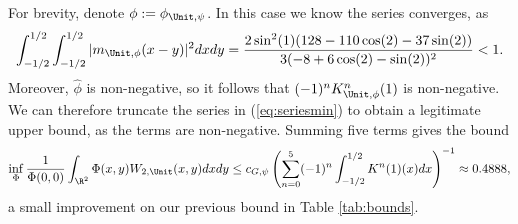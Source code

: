 For brevity, denote $\phi := \phi_{\Unit, \psi}$. In this case we know the series converges, as
\begin{align}
		\int_{-1/2}^{1/2} \int_{-1/2}^{1/2} |m_{\Unit, \phi}(x - y)|^2 dx dy = \frac{2 \sin^2 (1) (128 - 110 \cos (2) - 37 \sin (2))}{3 (-8 + 6 \cos (2) - \sin (2))^2} < 1.
\end{align}
Moreover, $\widehat{\phi}$ is non-negative, so it follows that $(-1)^n K^n_{\Unit, \phi}(1)$ is non-negative. We can therefore truncate the series in (\ref{eq:seriesmin}) to obtain a legitimate upper bound, as the terms are non-negative. Summing five terms gives the bound
	\begin{equation}
		\inf_\Phi \frac{1}{\Phi(0, 0)} \int_{\R^2} \Phi(x, y) W_{2, \Unit} (x, y) dx dy \leq c_{G, \psi}\left( \sum_{n = 0}^5 (-1)^n \int_{-1/2}^{1/2} K^n (1) (x) dx \right)^{-1} \approx 0.4888,
	\end{equation}
a small improvement on our previous bound in Table \ref{tab:bounds}.